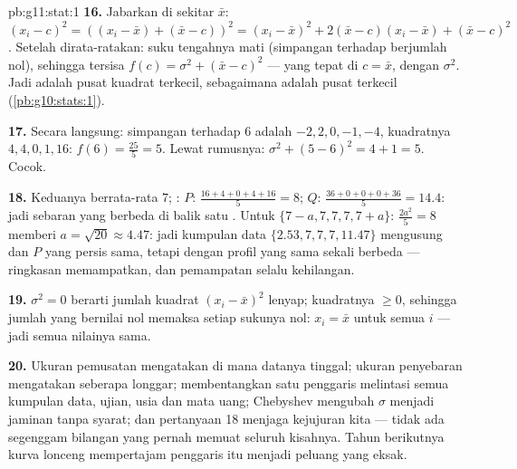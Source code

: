 \begin{solution}{pb:g11:stat:1}
\textbf{16.} Jabarkan di sekitar $\bar x$:
$(x_i - c)^2 = \left((x_i - \bar x) + (\bar x - c)\right)^2
= (x_i - \bar x)^2 + 2(\bar x - c)(x_i - \bar x) +
(\bar x - c)^2$. Setelah dirata-ratakan: suku tengahnya mati (simpangan
terhadap  berjumlah nol), sehingga tersisa
$f(c) = \sigma^2 + (\bar x - c)^2$ --- yang  tepat di
$c = \bar x$, dengan  $\sigma^2$. Jadi  adalah
pusat kuadrat terkecil, sebagaimana  adalah pusat 
terkecil (\cref{pb:g10:stats:1}).

\textbf{17.} Secara langsung: simpangan terhadap $6$ adalah
$-2, 2, 0, -1, -4$, kuadratnya $4, 4, 0, 1, 16$:
$f(6) = \frac{25}{5} = 5$. Lewat rumusnya:
$\sigma^2 + (5 - 6)^2 = 4 + 1 = 5$. Cocok.

\textbf{18.} Keduanya berrata-rata $7$; :
$P$: $\frac{16 + 4 + 0 + 4 + 16}{5} = 8$;
$Q$: $\frac{36 + 0 + 0 + 0 + 36}{5} = 14.4$: jadi sebaran yang berbeda
di balik satu . Untuk $\{7 - a, 7, 7, 7, 7 + a\}$: 
$\frac{2a^2}{5} = 8$ memberi $a = \sqrt{20} \approx 4.47$: jadi
kumpulan data $\{2.53, 7, 7, 7, 11.47\}$ mengusung  dan
 $P$ yang persis sama, tetapi dengan profil yang sama sekali berbeda ---
ringkasan memampatkan, dan pemampatan selalu kehilangan.

\textbf{19.} $\sigma^2 = 0$ berarti jumlah kuadrat
$(x_i - \bar x)^2$ lenyap; kuadratnya $\geq 0$, sehingga jumlah yang
bernilai nol memaksa setiap sukunya nol: $x_i = \bar x$ untuk semua $i$
--- jadi semua nilainya sama.

\textbf{20.} Ukuran pemusatan mengatakan di mana datanya tinggal; ukuran
penyebaran mengatakan seberapa longgar;  membentangkan satu penggaris
melintasi semua kumpulan data, ujian, usia dan mata uang;
Chebyshev mengubah $\sigma$ menjadi jaminan tanpa syarat; dan pertanyaan 18
menjaga kejujuran kita --- tidak ada segenggam bilangan yang pernah memuat
seluruh kisahnya. Tahun berikutnya kurva lonceng mempertajam penggaris itu
menjadi peluang yang eksak.

\end{solution}
